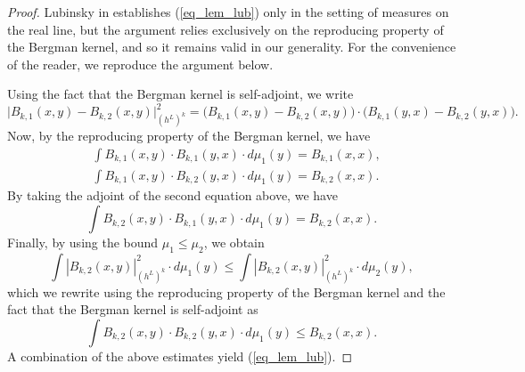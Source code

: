 \documentclass[12pt]{article}
\numberwithin{equation}{section}
\theoremstyle{theorem}
\theoremstyle{definition}
\theoremstyle{remark}
\begin{document}
	\begin{proof}
		Lubinsky in \cite{LubinskyUnivers} establishes (\ref{eq_lem_lub}) only in the setting of measures on the real line, but the argument relies exclusively on the reproducing property of the Bergman kernel, and so it remains valid in our generality.
		For the convenience of the reader, we reproduce the argument below.
		\par 
		Using the fact that the Bergman kernel is self-adjoint, we write
		\begin{equation}
			\Big|
			B_{k, 1}(x, y)
			-
			B_{k, 2}(x, y)
			\Big|_{(h^L)^k}^2 
			=
			\Big(
			B_{k, 1}(x, y)
			-
			B_{k, 2}(x, y)
			\Big)
			\cdot
			\Big(
			B_{k, 1}(y, x)
			-
			B_{k, 2}(y, x)
			\Big).
		\end{equation}
		Now, by the reproducing property of the Bergman kernel, we have
		\begin{equation}
		\begin{aligned}
			&
			\int
			B_{k, 1}(x, y)
			\cdot
			B_{k, 1}(y, x)
			\cdot
			d \mu_1(y)
			=
			B_{k, 1}(x, x),
			\\
			&
			\int
			B_{k, 1}(x, y)
			\cdot
			B_{k, 2}(y, x)
			\cdot
			d \mu_1(y)
			=
			B_{k, 2}(x, x).
		\end{aligned}
		\end{equation}
		By taking the adjoint of the second equation above, we have
		\begin{equation}
			\int
			B_{k, 2}(x, y)
			\cdot
			B_{k, 1}(y, x)
			\cdot
			d \mu_1(y)
			=
			B_{k, 2}(x, x).
		\end{equation}
		Finally, by using the bound $\mu_1 \leq \mu_2$, we obtain
		\begin{equation}
			\int
			|B_{k, 2}(x, y)|_{(h^L)^k}^2 
			\cdot
			d \mu_1(y)
			\leq
			\int
			|B_{k, 2}(x, y)|_{(h^L)^k}^2 
			\cdot
			d \mu_2(y),
		\end{equation}
		which we rewrite using the reproducing property of the Bergman kernel and the fact that the Bergman kernel is self-adjoint as
		\begin{equation}
			\int
			B_{k, 2}(x, y)
			\cdot
			B_{k, 2}(y, x)
			\cdot
			d \mu_1(y)
			\leq
			B_{k, 2}(x, x).
		\end{equation}
		A combination of the above estimates yield (\ref{eq_lem_lub}).
	\end{proof}
\end{document}
